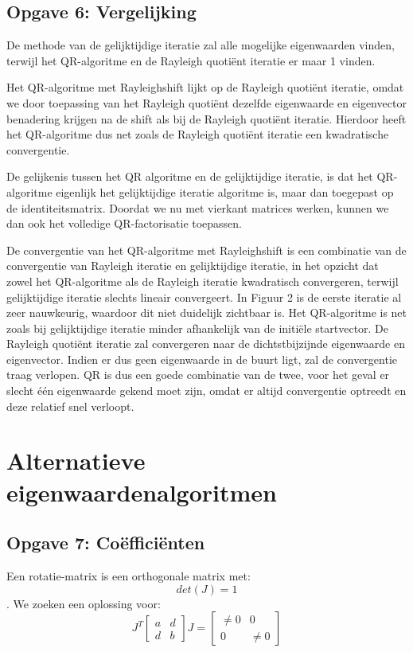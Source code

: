\documentclass[a4paper]{article}
\newcommand{\opgave}[1]{\subsection{Opgave #1}}
\begin{document}
\opgave{6: Vergelijking}\label{sec:oef6}

De methode van de gelijktijdige iteratie zal alle mogelijke eigenwaarden vinden, terwijl het 	 QR-algoritme en de Rayleigh quoti\"ent iteratie er maar 1 vinden. \par\noindent 
    Het QR-algoritme met Rayleighshift lijkt op de Rayleigh quoti\"ent iteratie, omdat we door 		toepassing van het Rayleigh quoti\"ent dezelfde eigenwaarde en eigenvector benadering krijgen 	  na de shift als bij de Rayleigh quoti\"ent iteratie. Hierdoor heeft het QR-algoritme dus net 		zoals de Rayleigh quoti\"ent iteratie een kwadratische convergentie. \par\noindent
    De gelijkenis tussen het QR algoritme en de gelijktijdige iteratie, is dat het QR-algoritme 	eigenlijk het gelijktijdige iteratie algoritme is, maar dan toegepast op de identiteitsmatrix. 	   Doordat we nu met vierkant matrices werken, kunnen we dan ook het volledige QR-factorisatie 		toepassen.
    \\ \par\noindent
    De convergentie van het QR-algoritme met Rayleighshift is een combinatie van de convergentie 	 van Rayleigh iteratie en gelijktijdige iteratie, in het opzicht dat zowel het QR-algoritme als 	de Rayleigh iteratie kwadratisch convergeren, terwijl gelijktijdige iteratie slechts lineair 	 convergeert. In Figuur 2 is de eerste iteratie al zeer nauwkeurig, waardoor dit niet duidelijk 	zichtbaar is. Het QR-algoritme is net zoals bij gelijktijdige iteratie minder afhankelijk van 	  de initi\"ele startvector. De Rayleigh quoti\"ent iteratie zal convergeren naar de 				dichtstbijzijnde eigenwaarde en eigenvector. Indien er dus geen eigenwaarde in de buurt ligt, 	  zal de convergentie traag verlopen. QR is dus een goede combinatie van de twee, voor het geval 	 er slecht \'e\'en eigenwaarde gekend moet zijn, omdat er altijd convergentie optreedt en deze 		relatief snel verloopt.

\section{Alternatieve eigenwaardenalgoritmen}\label{sec:alternatief}

\opgave{7: Co\"effici\"enten}\label{sec:oef7}

Een rotatie-matrix is een orthogonale matrix met: 
\begin{equation} \label{eq:rot-matrix}
det(J)=1
\end{equation}.
We zoeken een oplossing voor: 
\begin{equation} \label{eq:jacobi}
J^T 
\begin{bmatrix} a & d \\ d & b \end{bmatrix} 
J = 
\begin{bmatrix}\ne{0} & 0 \\ 0 & \ne{0}\end{bmatrix}
\end{equation}
\end{document}
